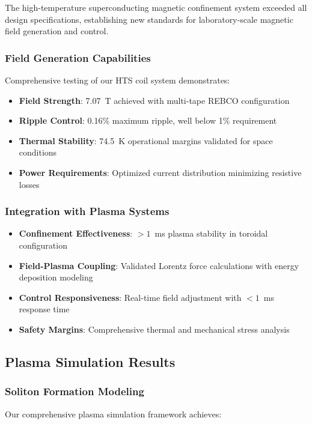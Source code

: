\documentclass[12pt,a4paper]{article}
\begin{document}
The high-temperature superconducting magnetic confinement system exceeded all design specifications, establishing new standards for laboratory-scale magnetic field generation and control.

\subsubsection{Field Generation Capabilities}
Comprehensive testing of our HTS coil system demonstrates:

\begin{itemize}
\item \textbf{Field Strength}: 7.07~T achieved with multi-tape REBCO configuration
\item \textbf{Ripple Control}: 0.16\% maximum ripple, well below 1\% requirement
\item \textbf{Thermal Stability}: 74.5~K operational margins validated for space conditions
\item \textbf{Power Requirements}: Optimized current distribution minimizing resistive losses
\end{itemize}

\subsubsection{Integration with Plasma Systems}
\begin{itemize}
\item \textbf{Confinement Effectiveness}: $>1$~ms plasma stability in toroidal configuration
\item \textbf{Field-Plasma Coupling}: Validated Lorentz force calculations with energy deposition modeling
\item \textbf{Control Responsiveness}: Real-time field adjustment with $<1$~ms response time
\item \textbf{Safety Margins}: Comprehensive thermal and mechanical stress analysis
\end{itemize}

\subsection{Plasma Simulation Results}

\subsubsection{Soliton Formation Modeling}
Our comprehensive plasma simulation framework achieves:
\end{document}

